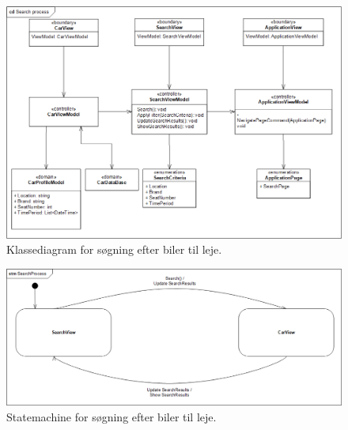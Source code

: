 \documentclass[Arkitektur/System_main.tex]{subfiles}
\begin{document}
\begin{figure}[H]
    \centering
    \includegraphics[width=1\textwidth]{Arkitektur/Softwarearkitektur/Searching/graphics/SearchProcessCD.png}
    \caption{Klassediagram for søgning efter biler til leje. }
    \label{fig:SearchProcessCD}
\end{figure}

\begin{figure}[H]
    \centering
    \includegraphics[width=1\textwidth]{Arkitektur/Softwarearkitektur/Searching/graphics/SearchProcessSTM.png}
    \caption{Statemachine for søgning efter biler til leje. }
    \label{fig:SearchProcessSTM}
\end{figure}
\end{document}
